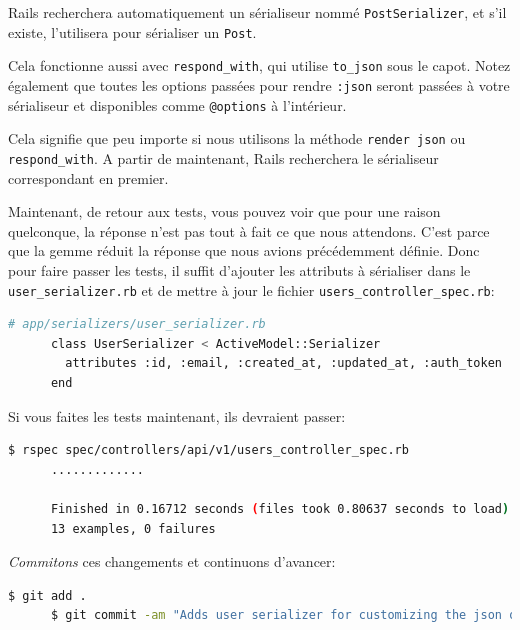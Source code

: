 \documentclass[]{report}
\begin{document}
    \begin{displayquote}
      Rails recherchera automatiquement un sérialiseur nommé \verb|PostSerializer|, et s'il existe, l'utilisera pour sérialiser un \verb|Post|.

      Cela fonctionne aussi avec \verb|respond_with|, qui utilise \verb|to_json| sous le capot. Notez également que toutes les options passées pour rendre \verb|:json| seront passées à votre sérialiseur et disponibles comme \verb|@options| à l'intérieur.

      Cela signifie que peu importe si nous utilisons la méthode \verb|render json| ou \verb|respond_with|. A partir de maintenant, Rails recherchera le sérialiseur correspondant en premier.
    \end{displayquote}

    Maintenant, de retour aux tests, vous pouvez voir que pour une raison quelconque, la réponse n'est pas tout à fait ce que nous attendons. C'est parce que la gemme réduit la réponse que nous avions précédemment définie. Donc pour faire passer les tests, il suffit d'ajouter les attributs à sérialiser dans le \verb|user_serializer.rb| et de mettre à jour le fichier \verb|users_controller_spec.rb|:

    \begin{scriptsize}
      \begin{lstlisting}[language=bash]
      # app/serializers/user_serializer.rb
      class UserSerializer < ActiveModel::Serializer
        attributes :id, :email, :created_at, :updated_at, :auth_token
      end
      \end{lstlisting}
    \end{scriptsize}

    Si vous faites les tests maintenant, ils devraient passer:

    \begin{scriptsize}
      \begin{lstlisting}[language=bash]
      $ rspec spec/controllers/api/v1/users_controller_spec.rb
      .............

      Finished in 0.16712 seconds (files took 0.80637 seconds to load)
      13 examples, 0 failures
      \end{lstlisting}
    \end{scriptsize}

    \textit{Commitons} ces changements et continuons d'avancer:

    \begin{scriptsize}
      \begin{lstlisting}[language=bash]
      $ git add .
      $ git commit -am "Adds user serializer for customizing the json output"
      \end{lstlisting}
    \end{scriptsize}
\end{document}
